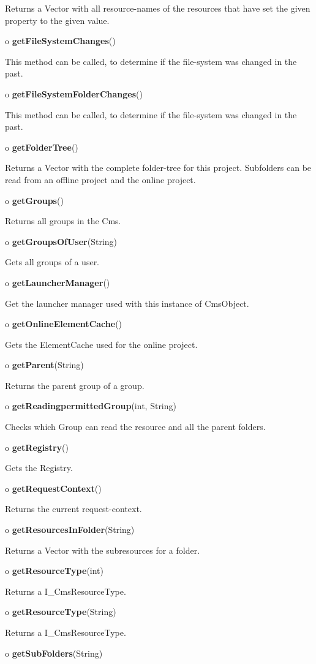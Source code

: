 \begin{description}
Returns a Vector with all resource-names of the resources that have set the
given property to the given value.
\item o {\bf getFileSystemChanges}()

This method can be called, to determine if the file-system was changed in the
past.
\item o {\bf getFileSystemFolderChanges}()

This method can be called, to determine if the file-system was changed in the
past.
\item o {\bf getFolderTree}()

Returns a Vector with the complete folder-tree for this project.\htmlBR
Subfolders can be read from an offline project and the online project.
\item o {\bf getGroups}()

Returns all groups in the Cms.
\item o {\bf getGroupsOfUser}(String)

Gets all groups of a user.
\item o {\bf getLauncherManager}()

Get the launcher manager used with this instance of CmsObject.
\item o {\bf getOnlineElementCache}()

Gets the ElementCache used for the online project.
\item o {\bf getParent}(String)

Returns the parent group of a group.
\item o {\bf getReadingpermittedGroup}(int, String)

Checks which Group can read the resource and all the parent folders.
\item o {\bf getRegistry}()

Gets the Registry.
\item o {\bf getRequestContext}()

Returns the current request-context.
\item o {\bf getResourcesInFolder}(String)

Returns a Vector with the subresources for a folder.\htmlBR
\item o {\bf getResourceType}(int)

Returns a I\_CmsResourceType.
\item o {\bf getResourceType}(String)

Returns a I\_CmsResourceType.
\item o {\bf getSubFolders}(String)


\end{description}
